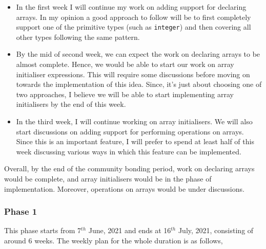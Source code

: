 \begin{itemize}

\item In the first week I will continue my work on adding support for declaring arrays. In my opinion a good approach to follow will be to first completely support one of the primitive types (such as \texttt{integer}) and then covering all other types following the same pattern.

\item By the mid of second week, we can expect the work on declaring arrays to be almost complete. Hence, we would be able to start our work on array initialiser expressions. This will require some discussions before moving on towards the implementation of this idea. Since, it's just about choosing one of two approaches, I believe we will be able to start implementing array initialisers by the end of this week.

\item In the third week, I will continue working on array initialisers. We will also start discussions on adding support for performing operations on arrays. Since this is an important feature, I will prefer to spend at least half of this week discussing various ways in which this feature can be implemented.

\end{itemize}

Overall, by the end of the community bonding period, work on declaring arrays would be complete, and array initialisers would be in the phase of implementation. Moreover, operations on arrays would be under discussions.

\subsubsection{Phase 1}

This phase starts from 7$^{th}$ June, 2021 and ends at 16$^{th}$ July, 2021, consisting of around 6 weeks. The weekly plan for the whole duration is as follows,

